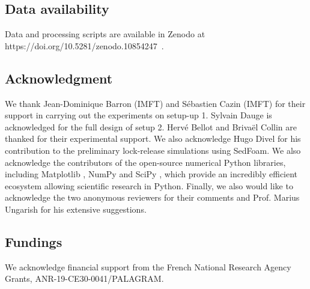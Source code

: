 \documentclass[12pt]{article}
\begin{document}


\subsection*{Data availability}

Data and processing scripts are available in Zenodo at https://doi.org/10.5281/zenodo.10854247~\citep{gadal2024dataset}.

\subsection*{Acknowledgment}
We thank Jean-Dominique Barron (IMFT) and Sébastien Cazin (IMFT) for their support in carrying out the experiments on setup-up 1.
%
Sylvain Dauge is acknowledged for the full design of setup 2. Hervé Bellot and Brivaël Collin are thanked for their experimental support.
%
We also acknowledge Hugo Divel for his contribution to the preliminary lock-release simulations using SedFoam.
%
We also acknowledge the contributors of the open-source numerical Python libraries, including Matplotlib \citep{Hunter2007}, NumPy \citep{Harris2020} and SciPy \citep{Virtanen2020}, which provide an incredibly efficient ecosystem allowing scientific research in Python.
%
Finally, we also would like to acknowledge the two anonymous reviewers for their comments and Prof. Marius Ungarish for his extensive suggestions.

\subsection*{Fundings}
We acknowledge financial support from the French National Research Agency Grants, ANR-19-CE30-0041/PALAGRAM.



\end{document}
